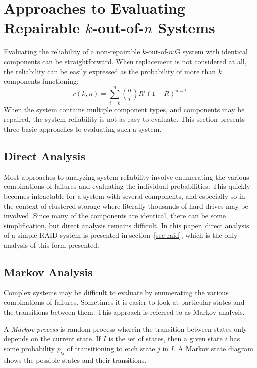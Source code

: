\documentclass[11pt]{article}
\numberwithin{equation}{section}
\begin{document}
\section{Approaches to Evaluating Repairable $k$-out-of-$n$ Systems}

Evaluating the reliability of a non-repairable $k$-out-of-$n$:G system with
identical components can be straightforward.  When replacement is not
considered at all, the reliability can be easily expressed as the probability
of more than $k$ components functioning:
$$r(k, n) = \sum_{i=k}^{n} {n \choose i} R^{i}(1 - R)^{n - i}$$
When the system contains multiple component types, and components may be
repaired, the system reliability is not as easy to evaluate.  This section
presents three basic approaches to evaluating such a system.

\subsection{Direct Analysis}

Most approaches to analyzing system reliability involve enumerating the various
combinations of failures and evaluating the individual probabilities.  This
quickly becomes intractable for a system with several components, and
especially so in the context of clustered storage where literally thousands of
hard drives may be involved.  Since many of the components are identical,
there can be some simplification, but direct analysis remains difficult.  In
this paper, direct analysis of a simple RAID system is presented in
section~\ref{sec-raid}, which is the only analysis of this form presented.

\subsection{Markov Analysis}

Complex systems may be difficult to evaluate by enumerating the various
combinations of failures.  Sometimes it is easier to look at particular states
and the transitions between them.  This approach is referred to as Markov
analysis.

A {\em Markov process} is random process wherein the transition between states
only depends on the current state.  If $I$ is the set of states, then a given
state $i$ has some probability $p_{ij}$ of transitioning to each state $j$ in
$I$.  A Markov state diagram shows the possible states and their transitions.
\end{document}
